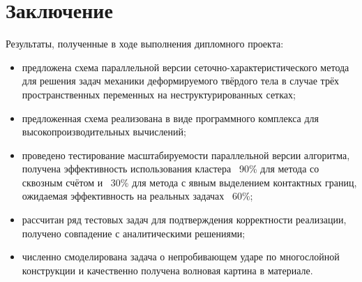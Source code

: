 \section{Заключение}
Результаты, полученные в ходе выполнения дипломного проекта:
\begin{itemize}
\item предложена схема параллельной версии сеточно-характеристического метода для решения задач механики деформируемого твёрдого тела в случае трёх пространственных переменных на неструктурированных сетках;
\item предложенная схема реализована в виде программного комплекса для высокопроизводительных вычислений;
\item проведено тестирование масштабируемости параллельной версии алгоритма, получена эффективность использования кластера ~90\% для метода со сквозным счётом и ~30\% для метода с явным выделением контактных границ, ожидаемая эффективность на реальных задачах ~60\%;
\item рассчитан ряд тестовых задач для подтверждения корректности реализации, получено совпадение с аналитическими решениями;
\item численно смоделирована задача о непробивающем ударе по многослойной конструкции и качественно получена волновая картина в материале.
\end{itemize}
